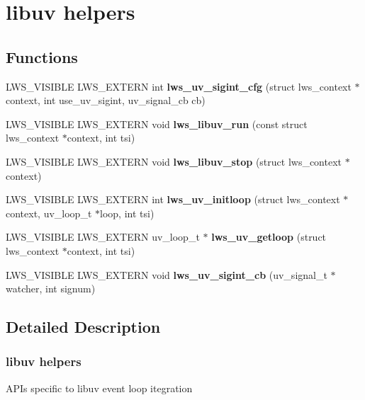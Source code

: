 \hypertarget{group__uv}{}\section{libuv helpers}
\label{group__uv}
\subsection*{Functions}
\begin{DoxyCompactItemize}
\item 
L\+W\+S\+\_\+\+V\+I\+S\+I\+B\+LE L\+W\+S\+\_\+\+E\+X\+T\+E\+RN int {\bfseries lws\+\_\+uv\+\_\+sigint\+\_\+cfg} (struct lws\+\_\+context $\ast$context, int use\+\_\+uv\+\_\+sigint, uv\+\_\+signal\+\_\+cb cb)\hypertarget{group__uv_ga99099e045993383f251a8026e1e40414}{}\label{group__uv_ga99099e045993383f251a8026e1e40414}

\item 
L\+W\+S\+\_\+\+V\+I\+S\+I\+B\+LE L\+W\+S\+\_\+\+E\+X\+T\+E\+RN void {\bfseries lws\+\_\+libuv\+\_\+run} (const struct lws\+\_\+context $\ast$context, int tsi)\hypertarget{group__uv_ga097c89497824d4de225a85a00661fc89}{}\label{group__uv_ga097c89497824d4de225a85a00661fc89}

\item 
L\+W\+S\+\_\+\+V\+I\+S\+I\+B\+LE L\+W\+S\+\_\+\+E\+X\+T\+E\+RN void {\bfseries lws\+\_\+libuv\+\_\+stop} (struct lws\+\_\+context $\ast$context)\hypertarget{group__uv_ga3c75cd6ec3f80fc0a0c8ead4c4e71a15}{}\label{group__uv_ga3c75cd6ec3f80fc0a0c8ead4c4e71a15}

\item 
L\+W\+S\+\_\+\+V\+I\+S\+I\+B\+LE L\+W\+S\+\_\+\+E\+X\+T\+E\+RN int {\bfseries lws\+\_\+uv\+\_\+initloop} (struct lws\+\_\+context $\ast$context, uv\+\_\+loop\+\_\+t $\ast$loop, int tsi)\hypertarget{group__uv_gad85ce3bfc53ff754988d36bf5de39e21}{}\label{group__uv_gad85ce3bfc53ff754988d36bf5de39e21}

\item 
L\+W\+S\+\_\+\+V\+I\+S\+I\+B\+LE L\+W\+S\+\_\+\+E\+X\+T\+E\+RN uv\+\_\+loop\+\_\+t $\ast$ {\bfseries lws\+\_\+uv\+\_\+getloop} (struct lws\+\_\+context $\ast$context, int tsi)\hypertarget{group__uv_gaa5e3593c94f91910d9d928dfa0c18f6c}{}\label{group__uv_gaa5e3593c94f91910d9d928dfa0c18f6c}

\item 
L\+W\+S\+\_\+\+V\+I\+S\+I\+B\+LE L\+W\+S\+\_\+\+E\+X\+T\+E\+RN void {\bfseries lws\+\_\+uv\+\_\+sigint\+\_\+cb} (uv\+\_\+signal\+\_\+t $\ast$watcher, int signum)\hypertarget{group__uv_gac5f60dba13a45e5d554b4fb7df7b9610}{}\label{group__uv_gac5f60dba13a45e5d554b4fb7df7b9610}

\end{DoxyCompactItemize}


\subsection{Detailed Description}
\subsubsection*{libuv helpers}

A\+P\+Is specific to libuv event loop itegration 